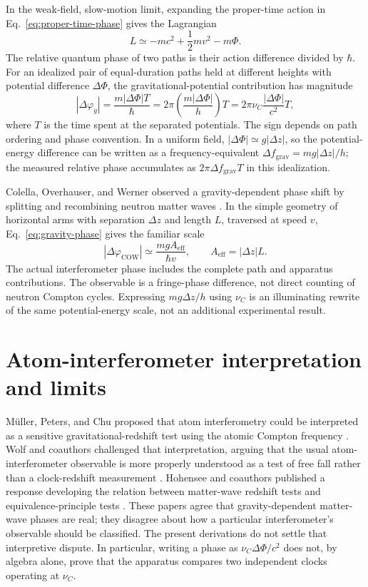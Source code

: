 \documentclass[12pt]{article}
\begin{document}
In the weak-field, slow-motion limit, expanding the proper-time action in Eq.~\eqref{eq:proper-time-phase} gives the Lagrangian
\begin{equation}
  L\simeq-mc^2+\frac{1}{2}mv^2-m\Phi.
  \label{eq:weak-field-lagrangian}
\end{equation}
The relative quantum phase of two paths is their action difference divided by $\hbar$. For an idealized pair of equal-duration paths held at different heights with potential difference $\Delta\Phi$, the gravitational-potential contribution has magnitude
\begin{equation}
  |\Delta\varphi_g|=\frac{m|\Delta\Phi|T}{\hbar}
   =2\pi\left(\frac{m|\Delta\Phi|}{h}\right)T
   =2\pi\nu_C\frac{|\Delta\Phi|}{c^2}T,
  \label{eq:gravity-phase}
\end{equation}
where $T$ is the time spent at the separated potentials. The sign depends on path ordering and phase convention. In a uniform field, $|\Delta\Phi|\simeq g|\Delta z|$, so the potential-energy difference can be written as a frequency-equivalent $\Delta f_{\mathrm{grav}}=mg|\Delta z|/h$; the measured relative phase accumulates as $2\pi\Delta f_{\mathrm{grav}}T$ in this idealization.

Colella, Overhauser, and Werner observed a gravity-dependent phase shift by splitting and recombining neutron matter waves \cite{COW}. In the simple geometry of horizontal arms with separation $\Delta z$ and length $L$, traversed at speed $v$, Eq.~\eqref{eq:gravity-phase} gives the familiar scale
\begin{equation}
  |\Delta\varphi_{\mathrm{COW}}|
  \simeq\frac{mgA_{\mathrm{eff}}}{\hbar v},
  \qquad A_{\mathrm{eff}}=|\Delta z|L.
  \label{eq:cow-phase}
\end{equation}
The actual interferometer phase includes the complete path and apparatus contributions. The observable is a fringe-phase difference, not direct counting of neutron Compton cycles. Expressing $mg\Delta z/h$ using $\nu_C$ is an illuminating rewrite of the same potential-energy scale, not an additional experimental result.

\section{Atom-interferometer interpretation and limits}

M\"uller, Peters, and Chu proposed that atom interferometry could be interpreted as a sensitive gravitational-redshift test using the atomic Compton frequency \cite{Muller}. Wolf and coauthors challenged that interpretation, arguing that the usual atom-interferometer observable is more properly understood as a test of free fall rather than a clock-redshift measurement \cite{Wolf}. Hohensee and coauthors published a response developing the relation between matter-wave redshift tests and equivalence-principle tests \cite{Hohensee}. These papers agree that gravity-dependent matter-wave phases are real; they disagree about how a particular interferometer's observable should be classified. The present derivations do not settle that interpretive dispute. In particular, writing a phase as $\nu_C\Delta\Phi/c^2$ does not, by algebra alone, prove that the apparatus compares two independent clocks operating at $\nu_C$.
\end{document}
